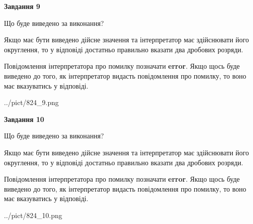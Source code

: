 \documentclass[12pt, ukrainian]{article}
\begin{document}
{\begin {Large}
{\begin {center}\textbf{Завдання 9}\end {center}}\par
Що буде виведено за виконання? \par

Якщо має бути виведено дійсне значення та інтерпретатор має здійснювати його округлення, 
то у відповіді достатньо правильно вказати два дробових розряди.

Повідомлення інтерпретатора про помилку позначати \textbf{error}.
Якщо щось буде виведено до того, як інтерпретатор видасть повідомлення про помилку, 
то воно має вказуватись у відповіді. \par

\begin{center}
	{../pict/824_9.png}
\end{center}
\newpage

{\begin {center}\textbf{Завдання 10}\end {center}}\par
Що буде виведено за виконання? \par

Якщо має бути виведено дійсне значення та інтерпретатор має здійснювати його округлення, 
то у відповіді достатньо правильно вказати два дробових розряди.

Повідомлення інтерпретатора про помилку позначати \textbf{error}.
Якщо щось буде виведено до того, як інтерпретатор видасть повідомлення про помилку, 
то воно має вказуватись у відповіді. \par

\begin{center}
	{../pict/824_10.png}
\end{center}
\newpage

\end {Large}}
\end{document}
